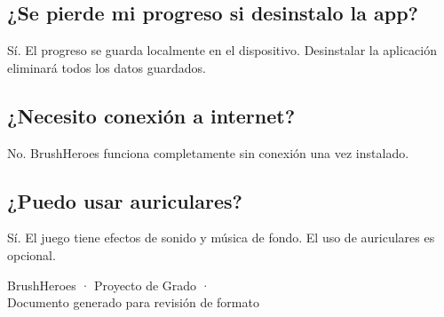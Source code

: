 \documentclass[12pt, a4paper]{article}
\begin{document}
\subsection*{¿Se pierde mi progreso si desinstalo la app?}
Sí. El progreso se guarda localmente en el dispositivo. Desinstalar la aplicación eliminará
todos los datos guardados.

\subsection*{¿Necesito conexión a internet?}
No. BrushHeroes funciona completamente sin conexión una vez instalado.

\subsection*{¿Puedo usar auriculares?}
Sí. El juego tiene efectos de sonido y música de fondo. El uso de auriculares es opcional.

\vfill
\begin{center}
  \small\color{heroGray}
  BrushHeroes · Proyecto de Grado · \the\year \\
  Documento generado para revisión de formato
\end{center}
\end{document}
